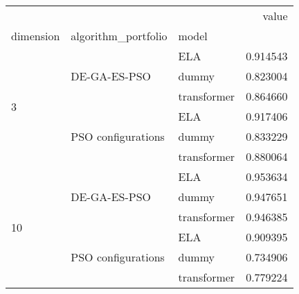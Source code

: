 \begin{tabular}{lllr}
\toprule
 &  &  & value \\
dimension & algorithm_portfolio & model &  \\
\midrule
\multirow[t]{6}{*}{3} & \multirow[t]{3}{*}{DE-GA-ES-PSO} & ELA & 0.914543 \\
 &  & dummy & 0.823004 \\
 &  & transformer & 0.864660 \\
\cline{2-4}
 & \multirow[t]{3}{*}{PSO configurations} & ELA & 0.917406 \\
 &  & dummy & 0.833229 \\
 &  & transformer & 0.880064 \\
\cline{1-4} \cline{2-4}
\multirow[t]{6}{*}{10} & \multirow[t]{3}{*}{DE-GA-ES-PSO} & ELA & 0.953634 \\
 &  & dummy & 0.947651 \\
 &  & transformer & 0.946385 \\
\cline{2-4}
 & \multirow[t]{3}{*}{PSO configurations} & ELA & 0.909395 \\
 &  & dummy & 0.734906 \\
 &  & transformer & 0.779224 \\
\cline{1-4} \cline{2-4}
\bottomrule
\end{tabular}
